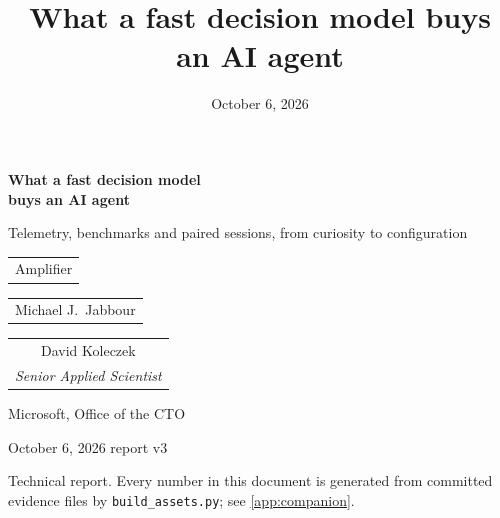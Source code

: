 \documentclass[11pt,letterpaper]{article}
\title{What a fast decision model buys an AI agent}
\date{October 6, 2026}
\newcommand{\code}[1]{\texttt{#1}}
\begin{document}
\begin{titlepage}
  \centering
  \vspace*{0.9in}
  {\LARGE\bfseries What a fast decision model\\[4pt] buys an AI agent\par}
  \vspace{10pt}
  {\Large Telemetry, benchmarks and paired sessions, from curiosity to configuration\par}
  \vspace{30pt}
  {\large\begin{tabular}[t]{c}Amplifier\end{tabular}\qquad
   \begin{tabular}[t]{c}Michael J.\ Jabbour\end{tabular}\qquad
   \begin{tabular}[t]{c}David Koleczek\\[-1pt]{\small\itshape Senior Applied Scientist}\end{tabular}\par}
  \vspace{6pt}
  {\normalsize Microsoft, Office of the CTO\par}
  \vspace{14pt}
  {\normalsize October 6, 2026 \textperiodcentered{} report v3\par}
  \vspace{30pt}
  \begin{minipage}{0.88\textwidth}
    
  \end{minipage}
  \vfill
  {\small Technical report. Every number in this document is generated from committed evidence files by
  \code{build\_assets.py}; see \cref{app:companion}.\par}
\end{titlepage}


\clearpage
{}\setcounter{tocdepth}{1}
\tableofcontents
\clearpage











\appendix



\end{document}

